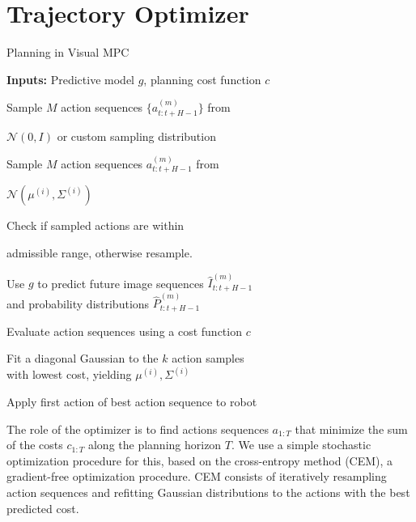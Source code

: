 \section{Trajectory Optimizer}

\begin{algorithm}[ht]
\caption{Planning in Visual MPC}
\label{alg:opt}
\begin{algorithmic}[1]
\State \textbf{Inputs:} Predictive model $g$, planning cost function $c$

\State \begin{varwidth}[t]{\linewidth}
	Sample $M$ action sequences $\{a^{(m)}_{t:t+H-1}\}$ from \par $\mathcal N(0, I)$ or
	custom sampling distribution
\end{varwidth}
\Else
\State \begin{varwidth}[t]{\linewidth}
	Sample $M$ action sequences ${a^{(m)}_{t:t+H-1}}$ from \par 
	$\mathcal N(\mu^{(i)}, \Sigma^{(i)})$
\end{varwidth}
\EndIf
\State 
\begin{varwidth}[t]{\linewidth}
Check if sampled actions are within \par
admissible range, otherwise resample.
\end{varwidth}
\State  \begin{varwidth}[t]{\linewidth}
	Use $g$ to predict future  image sequences $\hat{I}_{t:t+H-1}^{(m)}$\\ and probability distributions $\hat{P}_{t:t+H-1}^{(m)}$
\end{varwidth}
\State Evaluate action sequences using a cost function $c$
\State  \begin{varwidth}[t]{\linewidth}
	Fit a diagonal Gaussian to the $k$  action samples\\ with lowest cost,
	yielding $\mu^{(i)}, \Sigma^{(i)}$
\end{varwidth}
\EndFor
\State Apply first action of best action sequence to robot
\EndFor
\end{algorithmic}
\end{algorithm}


\label{sec:optimizer}
The role of the optimizer is to find actions sequences $a_{1:T}$ that minimize the sum of the costs $c_{1:T}$ along the planning horizon $T$. We use a simple stochastic optimization procedure for this, based on the cross-entropy method (CEM), a gradient-free optimization procedure. CEM consists of iteratively resampling action sequences and refitting Gaussian distributions to the actions with the best predicted cost.

